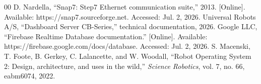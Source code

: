 ﻿\documentclass[conference]{IEEEtran}
\begin{document}
\begin{thebibliography}{00}
 D. Nardella, ``Snap7: Step7 Ethernet communication suite,'' 2013. [Online]. Available: https://snap7.sourceforge.net. Accessed: Jul. 2, 2026.
 Universal Robots A/S, ``Dashboard Server CB-Series,'' technical documentation, 2026.
 Google LLC, ``Firebase Realtime Database documentation.'' [Online]. Available: https://firebase.google.com/docs/database. Accessed: Jul. 2, 2026.
 S. Macenski, T. Foote, B. Gerkey, C. Lalancette, and W. Woodall, ``Robot Operating System 2: Design, architecture, and uses in the wild,'' \emph{Science Robotics}, vol. 7, no. 66, eabm6074, 2022.
\end{thebibliography}
\end{document}
